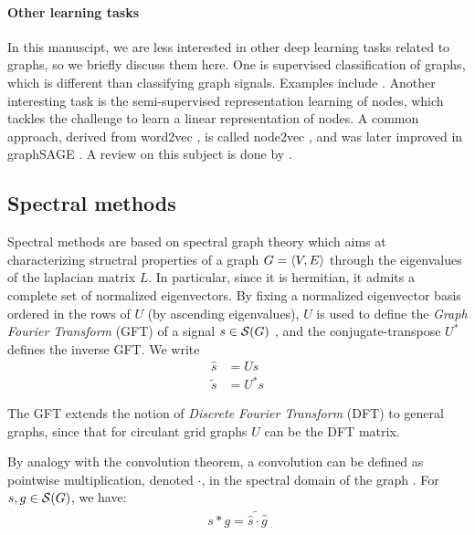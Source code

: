 \paragraph{Other learning tasks}
In this manuscipt, we are less interested in other deep learning tasks related to graphs, so we briefly discuss them here. One is supervised classification of graphs, which is different than classifying graph signals. Examples include \citep{niepert2016learning,tixier2017classifying}. Another interesting task is the semi-supervised representation learning of nodes, which tackles the challenge to learn a linear representation of nodes. A common approach, derived from word2vec \citep{mikolov2013efficient,mikolov2013distributed}, is called node2vec \citep{grover2016node2vec}, and was later improved in graphSAGE \citep{hamilton2017inductive}. A review on this subject is done by \cite{hamilton2017representation}.

\subsection{Spectral methods}
\label{sec:spec}

Spectral methods are based on spectral graph theory \citep{chung1996spectral} which aims at characterizing structral properties of a graph $G = \langle V, E \rangle$ through the eigenvalues of the laplacian matrix $L$. In particular, since it is hermitian, it admits a complete set of normalized eigenvectors. By fixing a normalized eigenvector basis ordered in the rows of $U$ (by ascending eigenvalues), $U$ is used to define the \emph{Graph Fourier Transform} (GFT) of a signal $s \in \mathcal{S}(G)$ \citep{shuman2013emerging}, and the conjugate-transpose $U^*$ defines the inverse GFT. We write
\begin{align}
\widehat{s} &= Us\\
\widetilde{s} &= U^*s
\end{align}

\begin{remark}
The GFT extends the notion of \emph{Discrete Fourier Transform} (DFT) to general graphs, since that for circulant grid graphs $U$ can be the DFT matrix.
\end{remark}

By analogy with the convolution theorem, a convolution can be defined as pointwise multiplication, denoted $\cdot$, in the spectral domain of the graph \citep{hammond2011wavelets}. For $s, g \in \mathcal{S}(G)$, we have:
\begin{gather}
s \ast g = \widetilde{\widehat{s} \cdot \widehat{g}} \label{eq:sc}
\end{gather}

